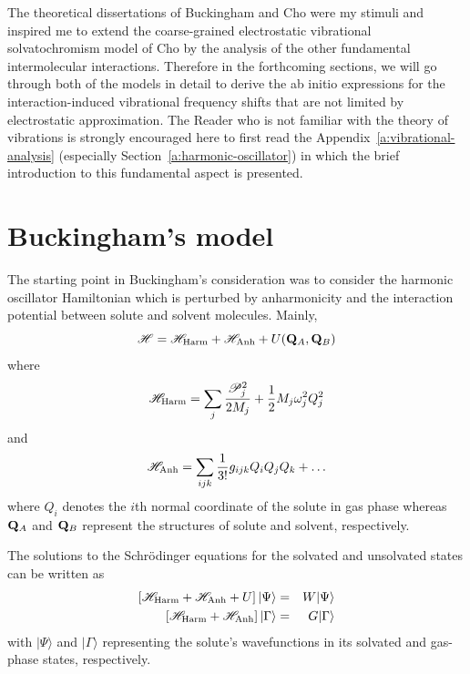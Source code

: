 \documentclass[a4paper,titlepage,twoside,fleqn,12pt]{book}
\begin{document}
\begin{refsection}
The theoretical dissertations of Buckingham and Cho were my stimuli and inspired
me to extend the coarse\hyp{}grained electrostatic vibrational solvatochromism 
model of Cho by the analysis of the other fundamental intermolecular interactions.
Therefore in the forthcoming sections, we will go through both of the models in detail
to derive the ab initio expressions for the interaction-induced 
vibrational frequency shifts that are not limited by electrostatic approximation.
The Reader who is not familiar with the theory of vibrations is strongly encouraged
here to first read the Appendix~\ref{a:vibrational-analysis} (especially Section~\ref{a:harmonic-oscillator})
in which the brief introduction to this fundamental aspect is presented.

\section{Buckingham's model  \label{s:buckingham-theory}}

The starting point in Buckingham's consideration was to consider 
the harmonic oscillator Hamiltonian which is perturbed by anharmonicity
and the interaction potential between solute and solvent molecules. Mainly,
%
\begin{equation}
\mathscr{H} = \mathscr{H}_{\rm Harm} + \mathscr{H}_{\rm Anh} + U({\bf Q}_A,{\bf Q}_B)
\end{equation}
%
where
%
\begin{equation}\label{e:h_harm}
\mathscr{H}_{\rm Harm} = 
\sum_j \frac{\mathscr{P}_j^2}{2M_j} + \frac{1}{2} M_j \omega_j^2 Q_j^2
\end{equation}
%
and
%
\begin{equation}\label{e:h_anh}
\mathscr{H}_{\rm Anh} = 
\sum_{ijk} \frac{1}{3!} g_{ijk} Q_iQ_jQ_k + \ldots 
\end{equation}
%
where $Q_i$ denotes the $i$th normal coordinate of the solute in gas phase whereas
${\bf Q}_A$ and ${\bf Q}_B$ represent the structures of solute and solvent, 
respectively.

The solutions to the Schr{\"o}dinger equations for the solvated and 
unsolvated states can be written as
%
\begin{eqnarray}
\left[ \mathscr{H}_{\rm Harm} + \mathscr{H}_{\rm Anh} + U \right] 
\vert \Psi \rangle &=& W \vert \Psi \rangle \\
\left[ \mathscr{H}_{\rm Harm} + \mathscr{H}_{\rm Anh} \right] 
\vert \Gamma \rangle &=& G \vert \Gamma \rangle 
\end{eqnarray}
%
with $\vert\Psi\rangle$ and $\vert\Gamma\rangle$ representing the solute's wavefunctions
in its solvated and gas-phase states, respectively.


\end{refsection}
\end{document}

